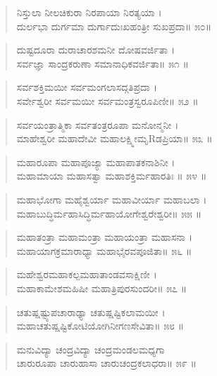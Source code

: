\begin{verse}
ನಿಸ್ತುಲಾ ನೀಲಚಿಕುರಾ ನಿರಪಾಯಾ ನಿರತ್ಯಯಾ ।\\ದುರ್ಲಭಾ ದುರ್ಗಮಾ ದುರ್ಗಾದುಃಖಹಂತ್ರೀ ಸುಖಪ್ರದಾ\num{॥ ೫೦॥}
\end{verse}

\begin{verse}
ದುಷ್ಟದೂರಾ ದುರಾಚಾರಶಮನೀ ದೋಷವರ್ಜಿತಾ ।\\ಸರ್ವಜ್ಞಾ ಸಾಂದ್ರಕರುಣಾ ಸಮಾನಾಧಿಕವರ್ಜಿತಾ\num{॥ ೫೧ ॥}
\end{verse}

\begin{verse}
ಸರ್ವಶಕ್ತಿಮಯೀ ಸರ್ವಮಂಗಲಾಸದ್ಗತಿಪ್ರದಾ ।\\ಸರ್ವೇಶ್ವರೀ ಸರ್ವಮಯೀ ಸರ್ವಮಂತ್ರಸ್ವರೂಪಿಣೀ\num{॥ ೫೨ ॥}
\end{verse}

\begin{verse}
ಸರ್ವಯಂತ್ರಾತ್ಮಿಕಾ ಸರ್ವತಂತ್ರರೂಪಾ ಮನೋನ್ಮನೀ ।\\ಮಾಹೇಶ್ವರೀ ಮಹಾದೇವೀ ಮಹಾಲಕ್ಷ್ಮೀಮೃRಡಪ್ರಿಯಾ\num{॥ ೫೩ ॥}
\end{verse}

\begin{verse}
ಮಹಾರೂಪಾ ಮಹಾಪೂಜ್ಯಾ ಮಹಾಪಾತಕನಾಶಿನೀ ।\\ಮಹಾಮಾಯಾ ಮಹಾಸತ್ವಾ ಮಹಾಶಕ್ತಿರ್ಮಹಾರತಿಃ \num{॥ ೫೪ ॥}
\end{verse}

\begin{verse}
ಮಹಾಭೋಗಾ ಮಹೈಶ್ವರ್ಯಾ ಮಹಾವೀರ್ಯಾ ಮಹಾಬಲಾ ।\\ಮಹಾಬುದ್ಧಿರ್ಮಹಾಸಿದ್ಧಿರ್ಮಹಾಯೋಗೇಶ್ವರೇಶ್ವರೀ\num{॥ ೫೫ ॥}
\end{verse}

\begin{verse}
ಮಹಾತಂತ್ರಾ ಮಹಾಮಂತ್ರಾ ಮಹಾಯಂತ್ರಾ ಮಹಾಸನಾ ।\\ಮಹಾಯಾಗಕ್ರಮಾರಾಧ್ಯಾ ಮಹಾಭೈರವಪೂಜಿತಾ\num{॥ ೫೬ ॥}
\end{verse}

\begin{verse}
ಮಹೇಶ್ವರಮಹಾಕಲ್ಪಮಹಾತಾಂಡವಸಾಕ್ಷಿಣೀ ।\\ಮಹಾಕಾಮೇಶಮಹಿಷೀ ಮಹಾತ್ರಿಪುರಸುಂದರೀ\num{॥ ೫೭ ॥}
\end{verse}

\begin{verse}
ಚತುಷ್ಷಷ್ಟ್ಯುಪಚಾರಾಢ್ಯಾ ಚತುಷ್ಷಷ್ಟಿಕಲಾಮಯೀ ।\\ಮಹಾಚತುಷ್ಷಷ್ಟಿಕೋಟಿಯೋಗಿನೀಗಣಸೇವಿತಾ\num{॥ ೫೮ ॥}
\end{verse}

\begin{verse}
ಮನುವಿದ್ಯಾ ಚಂದ್ರವಿದ್ಯಾ ಚಂದ್ರಮಂಡಲಮಧ್ಯಗಾ \\ಚಾರುರೂಪಾ ಚಾರುಹಾಸಾ ಚಾರುಚಂದ್ರಕಲಾಧರಾ\num{॥ ೫೯ ॥}
\end{verse}

